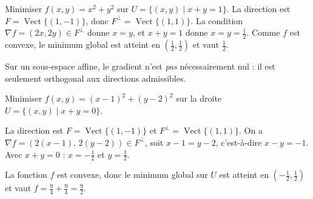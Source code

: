 \begin{exemple}
Minimiser $f(x,y)=x^2+y^2$ sur $U=\{(x,y)\mid x+y=1\}$. La direction est $F=\operatorname{Vect}\{(1,-1)\}$, donc $F^{\perp}=\operatorname{Vect}\{(1,1)\}$. La condition $\nabla f=(2x,2y)\in F^{\perp}$ donne $x=y$, et $x+y=1$ donne $x=y=\frac12$. Comme $f$ est convexe, le minimum global est atteint en $\left(\frac12,\frac12\right)$ et vaut $\frac12$.
\end{exemple}

\begin{attention}
Sur un sous-espace affine, le gradient n'est \emph{pas} nécessairement nul : il est seulement orthogonal aux directions admissibles.
\end{attention}

\begin{exercice}[Application]
Minimiser $f(x,y)=(x-1)^2+(y-2)^2$ sur la droite $U=\{(x,y)\mid x+y=0\}$.
\begin{correction}
La direction est $F=\operatorname{Vect}\{(1,-1)\}$ et $F^{\perp}=\operatorname{Vect}\{(1,1)\}$. On a $\nabla f=(2(x-1),\,2(y-2))\in F^{\perp}$, soit $x-1=y-2$, c'est-à-dire $x-y=-1$. Avec $x+y=0$ : $x=-\frac12$ et $y=\frac12$.

La fonction $f$ est convexe, donc le minimum global sur $U$ est atteint en $\left(-\frac12,\frac12\right)$ et vaut $f=\frac94+\frac94=\frac92$.
\end{correction}
\end{exercice}
